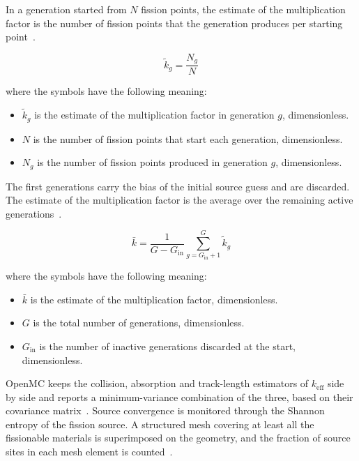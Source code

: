 In a generation started from $N$ fission points, the estimate of the
multiplication factor is the number of fission points that the
generation produces per starting point~\cite{lux_koblinger_1991}.

\begin{equation}
\tilde{k}_g = \frac{N_g}{N}
\label{eq:mc-kn}
\end{equation}

\noindent where the symbols have the following meaning:

\begin{itemize}
  \item $\tilde{k}_g$ is the estimate of the multiplication factor in
        generation $g$, dimensionless.

  \item $N$ is the number of fission points that start each generation,
        dimensionless.

  \item $N_g$ is the number of fission points produced in generation
        $g$, dimensionless.
\end{itemize}

The first generations carry the bias of the initial source guess and are
discarded. The estimate of the multiplication factor is the average over
the remaining active generations~\cite{lux_koblinger_1991}.

\begin{equation}
\bar{k} = \frac{1}{G - G_\mathrm{in}}
\sum_{g=G_\mathrm{in}+1}^{G} \tilde{k}_g
\label{eq:mc-kbar}
\end{equation}

\noindent where the symbols have the following meaning:

\begin{itemize}
  \item $\bar{k}$ is the estimate of the multiplication factor,
        dimensionless.

  \item $G$ is the total number of generations, dimensionless.

  \item $G_\mathrm{in}$ is the number of inactive generations discarded
        at the start, dimensionless.
\end{itemize}

OpenMC keeps the collision, absorption and track-length estimators of
$k_\mathrm{eff}$ side by side and reports a minimum-variance combination
of the three, based on their covariance
matrix~\cite{romano_openmc_2015}. Source convergence is monitored
through the Shannon entropy of the fission source. A structured mesh
covering at least all the fissionable materials is superimposed on the
geometry, and the fraction of source sites in each mesh element is
counted~\cite{openmc_docs}.

